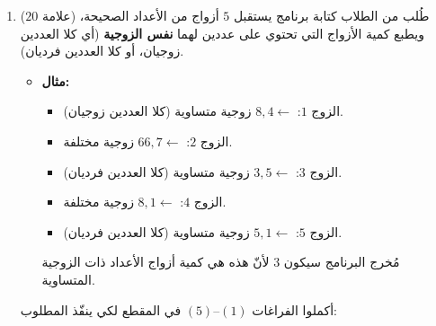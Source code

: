 \documentclass[14pt]{extarticle}
\begin{document}
\begin{enumerate}[resume, label=\textbf{السؤال \arabic*:}, wide=0pt, itemsep=2.2em]
\begin{boxCode}
\begin{english}
\begin{verbatim}
def create_stars_str():
    st = (1)____________("Please enter a string:")
    stars_str = (2)_______________________
    for index in range((3)___________):
        if (4)_________________:
            stars_str = stars_str + (5)____________
        else:
            stars_str = stars_str + (6)____________
    print((7)_______________)

create_stars_str()
\end{verbatim}
\end{english}
\end{boxCode}

\ifwithsols
\begin{boxSolution}
\begin{enumerate}[label=(\arabic*)]
\item \textenglish{\texttt{input}}
\item \textenglish{\texttt{""}}
\item \textenglish{\texttt{len(st)}}
\item \textenglish{\texttt{index \% 2 == 1}} (أو \textenglish{\texttt{index \% 2 == 0}} مع عكس الفرعين $(5)$ و $(6)$)
\item \textenglish{\texttt{"*"}}
\item \textenglish{\texttt{st[index]}}
\item \textenglish{\texttt{stars\_str}}
\end{enumerate}
\end{boxSolution}
\fi
\filbreak

\item ($20$ علامة) طُلب من الطلاب كتابة برنامج يستقبل $5$ أزواج من الأعداد الصحيحة، ويطبع كمية الأزواج التي تحتوي على عددين لهما \textbf{نفس الزوجية} (أي كلا العددين زوجيان، أو كلا العددين فرديان).
\begin{itemize}
\item \textbf{مثال:}
\begin{itemize}
\item الزوج $1$: $8, 4 \leftarrow$ زوجية متساوية (كلا العددين زوجيان).
\item الزوج $2$: $66, 7 \leftarrow$ زوجية مختلفة.
\item الزوج $3$: $3, 5 \leftarrow$ زوجية متساوية (كلا العددين فرديان).
\item الزوج $4$: $8, 1 \leftarrow$ زوجية مختلفة.
\item الزوج $5$: $5, 1 \leftarrow$ زوجية متساوية (كلا العددين فرديان).
\end{itemize}
مُخرج البرنامج سيكون $3$ لأنّ هذه هي كمية أزواج الأعداد ذات الزوجية المتساوية.
\end{itemize}
أكملوا الفراغات $(1)$–$(5)$ في المقطع لكي ينفّذ المطلوب:


\end{enumerate}
\end{document}
